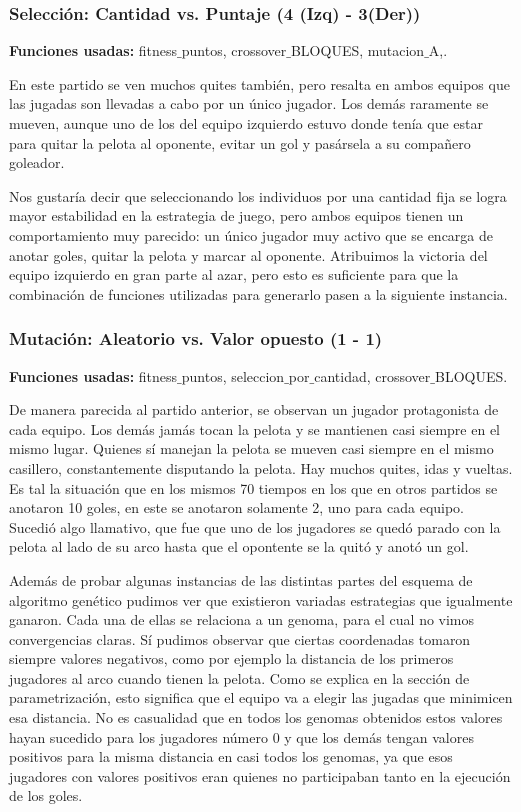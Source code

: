 \subsubsection*{Selección: Cantidad vs. Puntaje (4 (Izq) - 3(Der))}
\textbf{Funciones usadas: } fitness$\_$puntos, crossover$\_$BLOQUES, mutacion$\_$A,.

En este partido se ven muchos quites también, pero resalta en ambos equipos que las jugadas son llevadas a cabo por un único jugador.
Los demás raramente se mueven, aunque uno de los del equipo izquierdo estuvo donde tenía que estar para quitar la pelota al oponente, evitar un gol y pasársela a su compañero goleador.

Nos gustaría decir que seleccionando los individuos por una cantidad fija se logra mayor estabilidad en la estrategia de juego, pero ambos equipos tienen un comportamiento muy parecido: un único jugador muy activo que se encarga de anotar goles, quitar la pelota y marcar al oponente. Atribuimos la victoria del equipo izquierdo en gran parte al azar, pero esto es suficiente para que la combinación de funciones utilizadas para generarlo pasen a la siguiente instancia.

\subsubsection*{Mutación: Aleatorio vs. Valor opuesto (1 - 1)}
\textbf{Funciones usadas: } fitness$\_$puntos, seleccion$\_$por$\_$cantidad, crossover$\_$BLOQUES.

De manera parecida al partido anterior, se observan un jugador protagonista de cada equipo. Los demás jamás tocan la pelota y se mantienen casi siempre en el mismo lugar. Quienes sí manejan la pelota se mueven casi siempre en el mismo casillero, constantemente disputando la pelota. Hay muchos quites, idas y vueltas. Es tal la situación que en los mismos 70 tiempos en los que en otros partidos se anotaron 10 goles, en este se anotaron solamente 2, uno para cada equipo. Sucedió algo llamativo, que fue que uno de los jugadores se quedó parado con la pelota al lado de su arco hasta que el opontente se la quitó y anotó un gol.

Además de probar algunas instancias de las distintas partes del esquema de algoritmo genético pudimos ver que existieron variadas estrategias que igualmente ganaron. Cada una de ellas se relaciona a un genoma, para el cual no vimos convergencias claras. Sí pudimos observar que ciertas coordenadas tomaron siempre valores negativos, como por ejemplo la distancia de los primeros jugadores al arco cuando tienen la pelota. Como se explica en la sección de parametrización, esto significa que el equipo va a elegir las jugadas que minimicen esa distancia. No es casualidad que en todos los genomas obtenidos estos valores hayan sucedido para los jugadores número 0 y que los demás tengan valores positivos para la misma distancia en casi todos los genomas, ya que esos jugadores con valores positivos eran quienes no participaban tanto en la ejecución de los goles.

